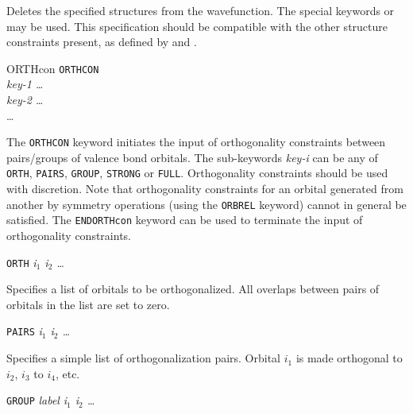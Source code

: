 \begin{keywordlist}
Deletes the specified structures from the wavefunction. The
special keywords  or  may be used. This specification should be compatible
with the other structure constraints present, as defined by  and .
\item[ORTHcon]
{\tt ORTHCON}\\
{\em key-1 \ldots}\\
{\em key-2 \ldots}\\
\ldots
{}

The {\tt ORTHCON} keyword initiates the input of orthogonality
constraints between pairs/groups of valence bond orbitals.
The sub-keywords {\em key-i\/} can be any of {\tt ORTH}, {\tt PAIRS},
{\tt GROUP}, {\tt STRONG} or {\tt FULL}. Orthogonality constraints
should be used with discretion. Note that orthogonality constraints
for an orbital generated from another by symmetry operations (using the
{\tt ORBREL} keyword) cannot in general be satisfied. The {\tt ENDORTHcon}
keyword can be used to terminate the input of orthogonality constraints.

{\tt ORTH}
{\em i$_1$ i$_2$ \ldots}

Specifies a list of orbitals to be orthogonalized. All overlaps
between pairs of orbitals in the list are set to zero.

{\tt PAIRS} {\em i$_1$ i$_2$ \ldots}

Specifies a simple list of orthogonalization pairs. Orbital $i_1$ is
made orthogonal to $i_2$, $i_3$ to $i_4$, etc.

{\tt GROUP} {\em label} {\em i$_1$ i$_2$ \ldots}


\end{keywordlist}
